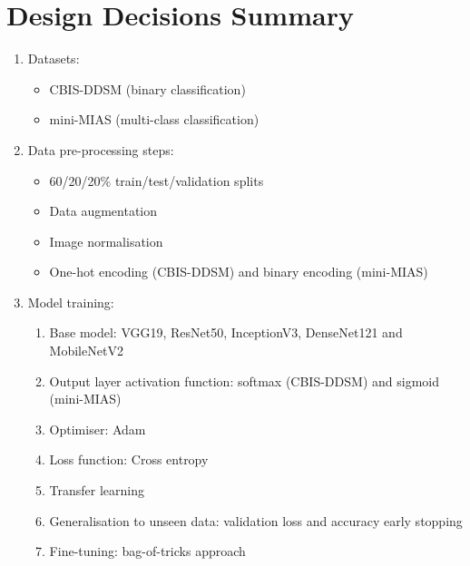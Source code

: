
\section{Design Decisions Summary}

\begin{enumerate}
    \item Datasets:
    \begin{itemize}
        \item CBIS-DDSM (binary classification)
        \item mini-MIAS (multi-class classification)
    \end{itemize}
    
    \item Data pre-processing steps:
    \begin{itemize}
        \item 60/20/20\% train/test/validation splits
        \item Data augmentation
        \item Image normalisation
        \item One-hot encoding (CBIS-DDSM) and binary encoding (mini-MIAS)
    \end{itemize}
    
    \item Model training:
     \begin{enumerate}
        \item Base model: VGG19, ResNet50, InceptionV3, DenseNet121 and MobileNetV2 
        \item Output layer activation function: softmax (CBIS-DDSM) and sigmoid (mini-MIAS)
        \item Optimiser: Adam
        \item Loss function: Cross entropy
        \item Transfer learning
        \item Generalisation to unseen data: validation loss and accuracy early stopping
        \item Fine-tuning: bag-of-tricks approach
    \end{enumerate}
    

\end{enumerate}
